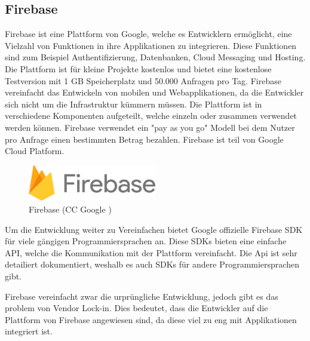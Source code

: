 ﻿\subsection{Firebase}

Firebase ist eine Plattform von Google, welche es Entwicklern ermöglicht, eine Vielzahl von Funktionen in ihre Applikationen zu integrieren. Diese Funktionen sind zum Beispiel Authentifizierung, Datenbanken, Cloud Messaging und Hosting. Die Plattform ist für kleine Projekte kostenlos und bietet eine kostenlose Testversion mit 1 GB Speicherplatz und 50.000 Anfragen pro Tag. Firebase vereinfacht das Entwickeln von mobilen und Webapplikationen, da die Entwickler sich nicht um die Infrastruktur kümmern müssen. Die Plattform ist in verschiedene Komponenten aufgeteilt, welche einzeln oder zusammen verwendet werden können. Firebase verwendet ein "pay as you go" Modell bei dem Nutzer pro Anfrage einen bestimmten Betrag bezahlen. Firebase ist teil von Google Cloud Platform.

\begin{figure}[h]
  \centering
  \includegraphics[width=0.5\textwidth]{images/firebase_logo}
  \caption{Firebase (CC Google \cite{cc})}
  \label{fig:firebase_logo}
\end{figure}

Um die Entwicklung weiter zu Vereinfachen bietet Google offizielle Firebase \ac{SDK} für viele gängigen Programmiersprachen an. Diese SDKs bieten eine einfache \ac{API}, welche die Kommunikation mit der Plattform vereinfacht. Die Api ist sehr detailiert dokumentiert, weshalb es auch SDKs für andere Programmiersprachen gibt.

Firebase vereinfacht zwar die urprüngliche Entwicklung, jedoch gibt es das problem von Vendor Lock-in. Dies bedeutet, dass die Entwickler auf die Plattform von Firebase angewiesen sind, da diese viel zu eng mit Applikationen integriert ist.
